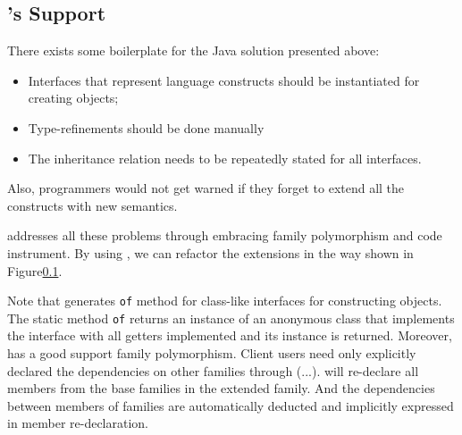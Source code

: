\subsection{\name's Support}
There exists some boilerplate for the Java solution presented above:
\begin{itemize}
  \item Interfaces that represent language constructs should be instantiated for
    creating objects;
  \item Type-refinements should be done manually
  \item The inheritance relation needs to be repeatedly stated for all interfaces.
\end{itemize}
Also, programmers would not get warned if they forget to extend all the
constructs with new semantics.

\name addresses all these problems through embracing family polymorphism and code instrument.
By using \name, we can refactor the extensions in the way shown in Figure\ref{}.

Note that \name generates \texttt{of} method for class-like interfaces for
constructing objects. The static method \texttt{of} returns an instance of an anonymous class
that implements the interface with all
getters implemented and its instance is returned.
Moreover, \name has a good support family polymorphism.
Client users need only explicitly declared the dependencies on other families
through (...). \name will re-declare all members from the base families in the extended family.
And the dependencies between members of families are automatically deducted and
implicitly expressed in member re-declaration.

